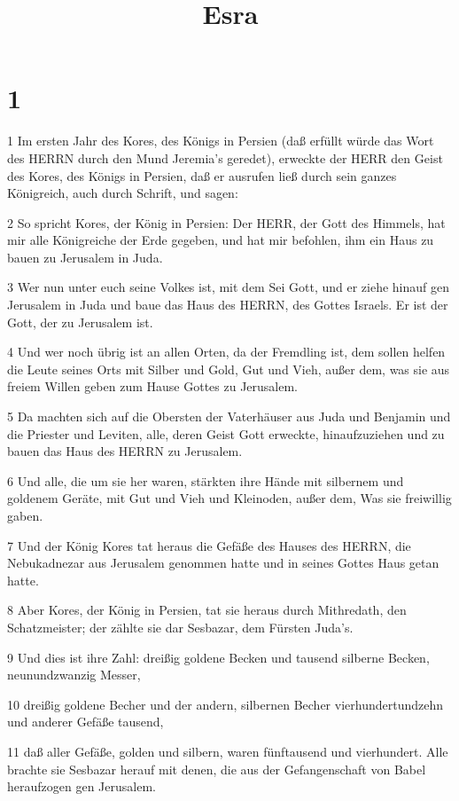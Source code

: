 

\title{Esra}


\chapter{1}

\par 1 Im ersten Jahr des Kores, des Königs in Persien (daß erfüllt würde das Wort des HERRN durch den Mund Jeremia's geredet), erweckte der HERR den Geist des Kores, des Königs in Persien, daß er ausrufen ließ durch sein ganzes Königreich, auch durch Schrift, und sagen:
\par 2 So spricht Kores, der König in Persien: Der HERR, der Gott des Himmels, hat mir alle Königreiche der Erde gegeben, und hat mir befohlen, ihm ein Haus zu bauen zu Jerusalem in Juda.
\par 3 Wer nun unter euch seine Volkes ist, mit dem Sei Gott, und er ziehe hinauf gen Jerusalem in Juda und baue das Haus des HERRN, des Gottes Israels. Er ist der Gott, der zu Jerusalem ist.
\par 4 Und wer noch übrig ist an allen Orten, da der Fremdling ist, dem sollen helfen die Leute seines Orts mit Silber und Gold, Gut und Vieh, außer dem, was sie aus freiem Willen geben zum Hause Gottes zu Jerusalem.
\par 5 Da machten sich auf die Obersten der Vaterhäuser aus Juda und Benjamin und die Priester und Leviten, alle, deren Geist Gott erweckte, hinaufzuziehen und zu bauen das Haus des HERRN zu Jerusalem.
\par 6 Und alle, die um sie her waren, stärkten ihre Hände mit silbernem und goldenem Geräte, mit Gut und Vieh und Kleinoden, außer dem, Was sie freiwillig gaben.
\par 7 Und der König Kores tat heraus die Gefäße des Hauses des HERRN, die Nebukadnezar aus Jerusalem genommen hatte und in seines Gottes Haus getan hatte.
\par 8 Aber Kores, der König in Persien, tat sie heraus durch Mithredath, den Schatzmeister; der zählte sie dar Sesbazar, dem Fürsten Juda's.
\par 9 Und dies ist ihre Zahl: dreißig goldene Becken und tausend silberne Becken, neunundzwanzig Messer,
\par 10 dreißig goldene Becher und der andern, silbernen Becher vierhundertundzehn und anderer Gefäße tausend,
\par 11 daß aller Gefäße, golden und silbern, waren fünftausend und vierhundert. Alle brachte sie Sesbazar herauf mit denen, die aus der Gefangenschaft von Babel heraufzogen gen Jerusalem.


